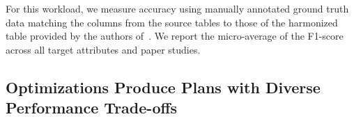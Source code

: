 For this workload, we measure accuracy using manually annotated ground truth data matching the columns from the source tables to those of the harmonized table provided by the authors of~\cite{li2023proteogenomic}.
We report the micro-average of the F1-score across all target attributes and paper studies. 




\subsection{Optimizations Produce Plans with Diverse Performance Trade-offs}
\label{sec:opt-and-tradeoffs}

